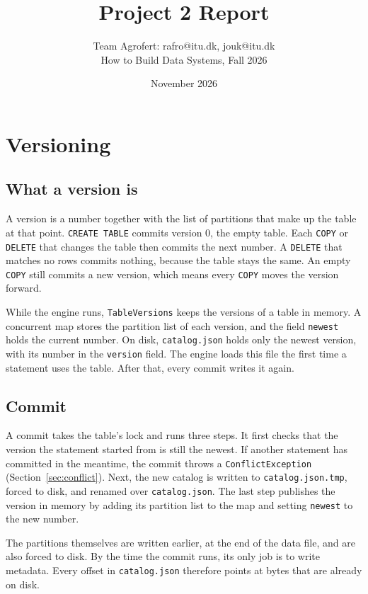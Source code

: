 \documentclass[11pt,a4paper,twocolumn]{article}
\title{Project 2 Report}
\author{Team Agrofert: rafro@itu.dk, jouk@itu.dk\\How to Build Data Systems, Fall 2026}
\date{November 2026}
\begin{document}
\maketitle


\section{Versioning}
\label{sec:versioning}

\subsection{What a version is}

A version is a number together with the list of partitions that make up the table at that point. \texttt{CREATE TABLE} commits version 0, the empty table. Each \texttt{COPY} or \texttt{DELETE} that changes the table then commits the next number. A \texttt{DELETE} that matches no rows commits nothing, because the table stays the same. An empty \texttt{COPY} still commits a new version, which means every \texttt{COPY} moves the version forward.

While the engine runs, \texttt{TableVersions} keeps the versions of a table in memory. A concurrent map stores the partition list of each version, and the field \texttt{newest} holds the current number. On disk, \texttt{catalog.json} holds only the newest version, with its number in the \texttt{version} field. The engine loads this file the first time a statement uses the table. After that, every commit writes it again.

\subsection{Commit}

A commit takes the table's lock and runs three steps. It first checks that the version the statement started from is still the newest. If another statement has committed in the meantime, the commit throws a \texttt{ConflictException} (Section~\ref{sec:conflict}). Next, the new catalog is written to \texttt{catalog.json.tmp}, forced to disk, and renamed over \texttt{catalog.json}. The last step publishes the version in memory by adding its partition list to the map and setting \texttt{newest} to the new number.

The partitions themselves are written earlier, at the end of the data file, and are also forced to disk. By the time the commit runs, its only job is to write metadata. Every offset in \texttt{catalog.json} therefore points at bytes that are already on disk.
\end{document}
